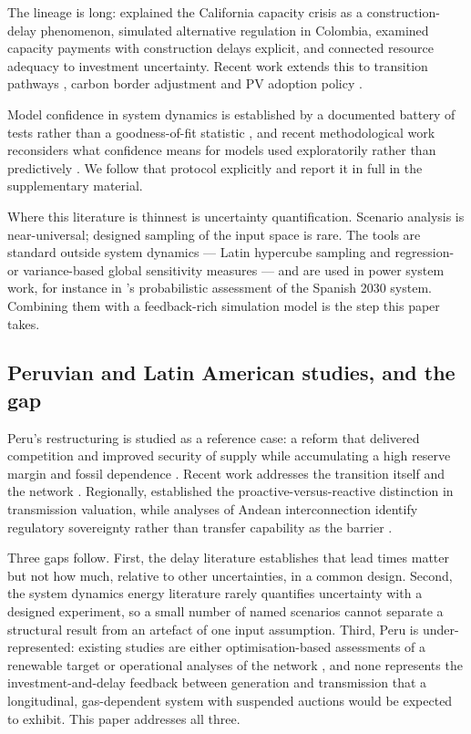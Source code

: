 The lineage is long: \citet{ford2001} explained the California capacity crisis as a
construction-delay phenomenon, \citet{arango2007} simulated alternative regulation in
Colombia, \citet{assili2008} examined capacity payments with construction delays
explicit, and \citet{simshauser2010} connected resource adequacy to investment
uncertainty. Recent work extends this to transition pathways
\citep{zapata2018,morcillo2018,luo2024}, carbon border adjustment \citep{lin2026} and
PV adoption policy \citep{oyarzun2026}.

Model confidence in system dynamics is established by a documented battery of tests
rather than a goodness-of-fit statistic \citep{barlas1996,oliva2004}, and recent
methodological work reconsiders what confidence means for models used exploratorily
rather than predictively \citep{richardson2024}. We follow that protocol explicitly
and report it in full in the supplementary material.

Where this literature is thinnest is uncertainty quantification. Scenario analysis is
near-universal; designed sampling of the input space is rare. The tools are standard
outside system dynamics --- Latin hypercube sampling \citep{mckay1992} and
regression- or variance-based global sensitivity measures \citep{homma1996} --- and
are used in power system work, for instance in \citeauthor{alvarez2026}'s
\citeyearpar{alvarez2026} probabilistic assessment of the Spanish 2030 system.
Combining them with a feedback-rich simulation model is the step this paper takes.

\subsection{Peruvian and Latin American studies, and the gap}
\label{sec:lit:gap}

Peru's restructuring is studied as a reference case: a reform that delivered
competition and improved security of supply while accumulating a high reserve margin
and fossil dependence \citep{rudnick2019,perezreyes2009}. Recent work addresses the
transition itself \citep{fiestas2024,delacruz2024} and the network
\citep{valdivia2024}. Regionally, \citet{sauma2006} established the
proactive-versus-reactive distinction in transmission valuation, while analyses of
Andean interconnection identify regulatory sovereignty rather than transfer capability
as the barrier \citep{guliev2022,sempertegui2017}.

Three gaps follow. First, the delay literature establishes that lead times matter but
not how much, relative to other uncertainties, in a common design. Second, the system
dynamics energy literature rarely quantifies uncertainty with a designed experiment,
so a small number of named scenarios cannot separate a structural result from an
artefact of one input assumption. Third, Peru is under-represented: existing studies
are either optimisation-based assessments of a renewable target
\citep{fiestas2024,delacruz2024} or operational analyses of the network
\citep{valdivia2024}, and none represents the investment-and-delay feedback between
generation and transmission that a longitudinal, gas-dependent system with suspended
auctions would be expected to exhibit. This paper addresses all three.
